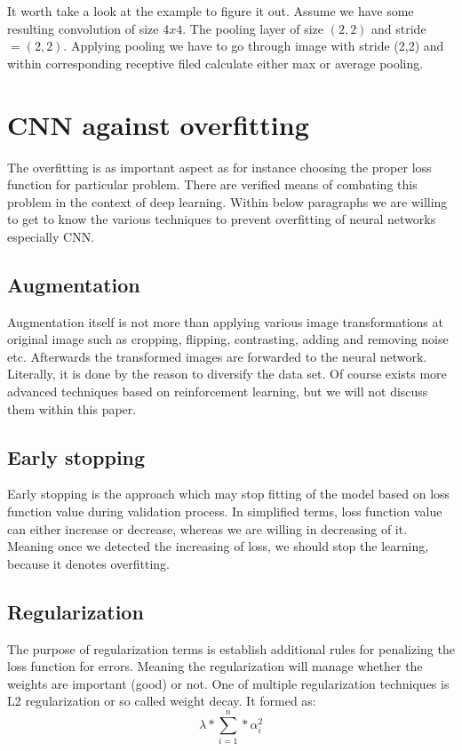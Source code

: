 It worth take a look at the example to figure it out. Assume we have some resulting convolution of size $4x4$. The pooling layer of size $(2, 2)$ and stride $ = (2, 2)$. 
Applying pooling we have to go through image with stride (2,2) and within corresponding receptive filed calculate either max or average pooling.  

\section{CNN against overfitting}
The overfitting is as important aspect as for instance choosing the proper loss function for particular problem. There are verified means of combating this problem in the context of deep learning. Within below paragraphs we are willing to get to know the various techniques to prevent overfitting of neural networks especially CNN. 

\subsection{Augmentation}
Augmentation itself is not more than applying various image transformations at original image such as cropping, flipping, contrasting, adding and removing noise etc. Afterwards the transformed images are forwarded to the neural network. Literally, it is done by the reason to diversify the data set. Of course exists more advanced techniques based on reinforcement learning, but we will not discuss them within this paper.      

\subsection{Early stopping}
Early stopping is the approach which may stop fitting of the model based on loss function value during validation process. In simplified terms, loss function value can either increase or decrease, whereas we are willing in decreasing of it. Meaning once we detected the increasing of loss, we should stop the learning, because it denotes overfitting.      

\subsection{Regularization}
The purpose of regularization terms is establish additional rules for penalizing the loss function for errors. Meaning the regularization will manage whether the weights are important (good) or not. One of multiple regularization techniques is L2 regularization or so called weight decay. It formed as:
\[ \lambda*\sum_{i=1}^{n}*\alpha_i^2 \]

